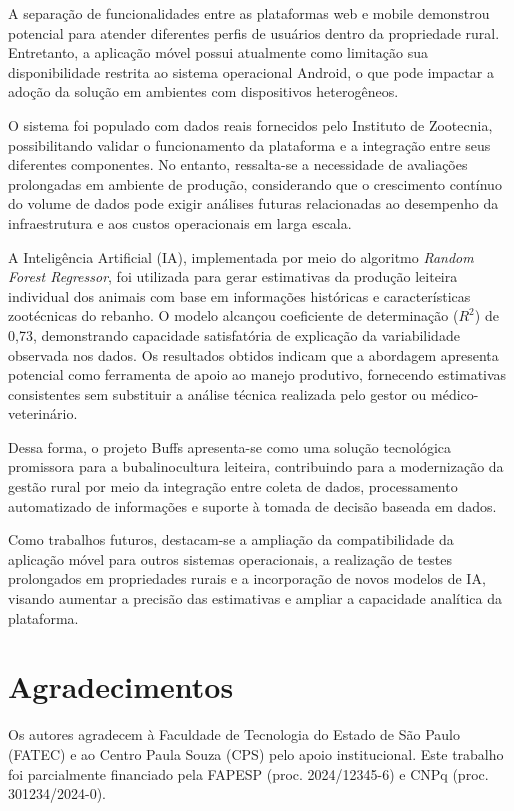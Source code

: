 \documentclass[11pt,a4paper]{article}
\begin{document}
A separação de funcionalidades entre as plataformas web e mobile demonstrou potencial para atender diferentes perfis de usuários dentro da propriedade rural. Entretanto, a aplicação móvel possui atualmente como limitação sua disponibilidade restrita ao sistema operacional Android, o que pode impactar a adoção da solução em ambientes com dispositivos heterogêneos.

O sistema foi populado com dados reais fornecidos pelo Instituto de Zootecnia, possibilitando validar o funcionamento da plataforma e a integração entre seus diferentes componentes. No entanto, ressalta-se a necessidade de avaliações prolongadas em ambiente de produção, considerando que o crescimento contínuo do volume de dados pode exigir análises futuras relacionadas ao desempenho da infraestrutura e aos custos operacionais em larga escala.

A Inteligência Artificial (IA), implementada por meio do algoritmo \textit{Random Forest Regressor}, foi utilizada para gerar estimativas da produção leiteira individual dos animais com base em informações históricas e características zootécnicas do rebanho. O modelo alcançou coeficiente de determinação (\(R^2\)) de 0,73, demonstrando capacidade satisfatória de explicação da variabilidade observada nos dados. Os resultados obtidos indicam que a abordagem apresenta potencial como ferramenta de apoio ao manejo produtivo, fornecendo estimativas consistentes sem substituir a análise técnica realizada pelo gestor ou médico-veterinário.

Dessa forma, o projeto Buffs apresenta-se como uma solução tecnológica promissora para a bubalinocultura leiteira, contribuindo para a modernização da gestão rural por meio da integração entre coleta de dados, processamento automatizado de informações e suporte à tomada de decisão baseada em dados.

Como trabalhos futuros, destacam-se a ampliação da compatibilidade da aplicação móvel para outros sistemas operacionais, a realização de testes prolongados em propriedades rurais e a incorporação de novos modelos de IA, visando aumentar a precisão das estimativas e ampliar a capacidade analítica da plataforma.

\section*{Agradecimentos}
Os autores agradecem à Faculdade de Tecnologia do Estado de São Paulo (FATEC) e ao Centro Paula Souza (CPS) pelo apoio institucional. Este trabalho foi parcialmente financiado pela FAPESP (proc. 2024/12345-6) e CNPq (proc. 301234/2024-0).



\end{document}
